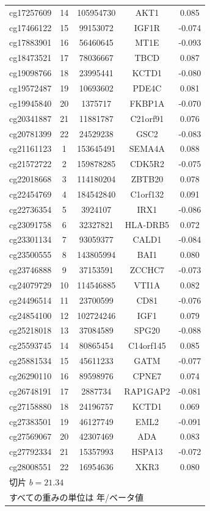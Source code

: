 \documentclass[12pt,a4paper]{ltjsarticle}
\begin{document}
\begin{longtable}{|c|c|c|c|c|}
		cg17257609 & 14 & 105954730 & AKT1 & 0.085 \\
		cg17466122 & 15 & 99153072 & IGF1R & -0.074 \\
		cg17883901 & 16 & 56460645 & MT1E & -0.093 \\
		cg18473521 & 17 & 78036667 & TBCD & 0.087 \\
		cg19098766 & 18 & 23995441 & KCTD1 & -0.080 \\
		cg19572487 & 19 & 10693602 & PDE4C & 0.081 \\
		cg19945840 & 20 & 1375717 & FKBP1A & -0.070 \\
		cg20341887 & 21 & 11881787 & C21orf91 & 0.076 \\
		cg20781399 & 22 & 24529238 & GSC2 & -0.083 \\
		cg21161123 & 1 & 153645491 & SEMA4A & 0.088 \\
		cg21572722 & 2 & 159878285 & CDK5R2 & -0.075 \\
		cg22018668 & 3 & 114180204 & ZBTB20 & 0.078 \\
		cg22454769 & 4 & 184542840 & C1orf132 & 0.091 \\
		cg22736354 & 5 & 3924107 & IRX1 & -0.086 \\
		cg23091758 & 6 & 32327821 & HLA-DRB5 & 0.072 \\
		cg23301134 & 7 & 93059377 & CALD1 & -0.084 \\
		cg23500555 & 8 & 143805994 & BAI1 & 0.080 \\
		cg23746888 & 9 & 37153591 & ZCCHC7 & -0.073 \\
		cg24079729 & 10 & 114546885 & VTI1A & 0.082 \\
		cg24496514 & 11 & 23700599 & CD81 & -0.076 \\
		cg24854100 & 12 & 102724246 & IGF1 & 0.079 \\
		cg25218018 & 13 & 37084589 & SPG20 & -0.088 \\
		cg25593745 & 14 & 80865454 & C14orf145 & 0.085 \\
		cg25881534 & 15 & 45611233 & GATM & -0.077 \\
		cg26290110 & 16 & 89598976 & CPNE7 & 0.074 \\
		cg26748191 & 17 & 2887734 & RAP1GAP2 & -0.081 \\
		cg27158880 & 18 & 24196757 & KCTD1 & 0.069 \\
		cg27383501 & 19 & 46127749 & EML2 & -0.091 \\
		cg27569067 & 20 & 42307469 & ADA & 0.083 \\
		cg27792334 & 21 & 15357993 & HSPA13 & -0.072 \\
		cg28008551 & 22 & 16954636 & XKR3 & 0.080 \\
		\hline
		\multicolumn{5}{l}{\footnotesize 切片 \(b = 21.34\)} \\
		\multicolumn{5}{l}{\footnotesize すべての重みの単位は 年/ベータ値} \\
	\end{longtable}
	
\end{document}
